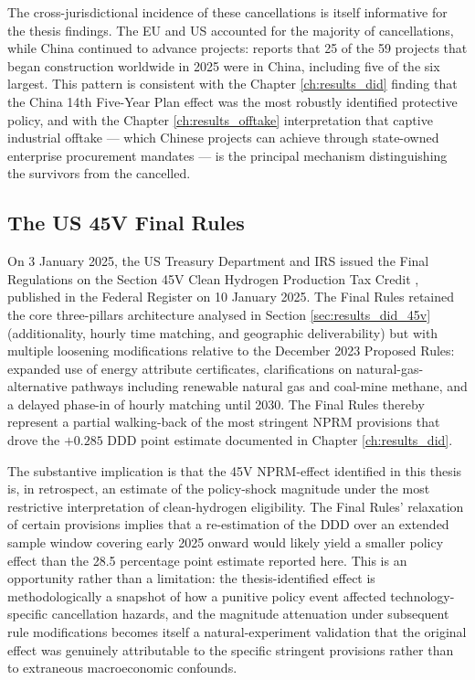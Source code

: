 The cross-jurisdictional incidence of these cancellations is itself informative for the thesis findings. The EU and US accounted for the majority of cancellations, while China continued to advance projects: \cite{iea2025hydrogen} reports that 25 of the 59 projects that began construction worldwide in 2025 were in China, including five of the six largest. This pattern is consistent with the Chapter \ref{ch:results_did} finding that the China 14th Five-Year Plan effect was the most robustly identified protective policy, and with the Chapter \ref{ch:results_offtake} interpretation that captive industrial offtake --- which Chinese projects can achieve through state-owned enterprise procurement mandates --- is the principal mechanism distinguishing the survivors from the cancelled.

\subsection*{The US 45V Final Rules}

On 3 January 2025, the US Treasury Department and IRS issued the Final Regulations on the Section 45V Clean Hydrogen Production Tax Credit \cite{treasury2025final45v}, published in the Federal Register on 10 January 2025. The Final Rules retained the core three-pillars architecture analysed in Section \ref{sec:results_did_45v} (additionality, hourly time matching, and geographic deliverability) but with multiple loosening modifications relative to the December 2023 Proposed Rules: expanded use of energy attribute certificates, clarifications on natural-gas-alternative pathways including renewable natural gas and coal-mine methane, and a delayed phase-in of hourly matching until 2030. The Final Rules thereby represent a partial walking-back of the most stringent NPRM provisions that drove the $+0.285$ DDD point estimate documented in Chapter \ref{ch:results_did}.

The substantive implication is that the 45V NPRM-effect identified in this thesis is, in retrospect, an estimate of the policy-shock magnitude under the most restrictive interpretation of clean-hydrogen eligibility. The Final Rules' relaxation of certain provisions implies that a re-estimation of the DDD over an extended sample window covering early 2025 onward would likely yield a smaller policy effect than the 28.5 percentage point estimate reported here. This is an opportunity rather than a limitation: the thesis-identified effect is methodologically a snapshot of how a punitive policy event affected technology-specific cancellation hazards, and the magnitude attenuation under subsequent rule modifications becomes itself a natural-experiment validation that the original effect was genuinely attributable to the specific stringent provisions rather than to extraneous macroeconomic confounds.

